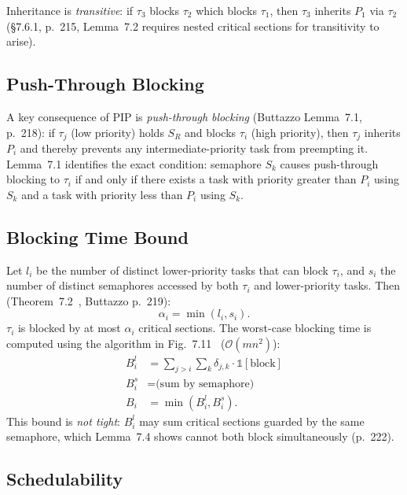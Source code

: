 \documentclass[conference]{IEEEtran}
\begin{document}
Inheritance is \emph{transitive}: if $\tau_3$ blocks $\tau_2$ which
blocks $\tau_1$, then $\tau_3$ inherits $P_1$ via $\tau_2$
(§7.6.1, p.~215, Lemma~7.2 requires nested critical sections for
transitivity to arise).

\subsection{Push-Through Blocking}

A key consequence of PIP is \emph{push-through blocking}
(Buttazzo Lemma~7.1, p.~218): if $\tau_j$ (low priority) holds
$S_R$ and blocks $\tau_i$ (high priority), then $\tau_j$ inherits
$P_i$ and thereby prevents any intermediate-priority task from preempting
it.
Lemma~7.1 identifies the exact condition:
semaphore $S_k$ causes push-through blocking to $\tau_i$ if and only
if there exists a task with priority greater than $P_i$ using $S_k$
and a task with priority less than $P_i$ using $S_k$.

\subsection{Blocking Time Bound}

Let $l_i$ be the number of distinct lower-priority tasks that can block
$\tau_i$, and $s_i$ the number of distinct semaphores accessed by both
$\tau_i$ and lower-priority tasks.
Then (Theorem~7.2~\cite{Sha1990}, Buttazzo p.~219):
\begin{equation}
  \alpha_i = \min(l_i, s_i).
  \label{eq:alpha}
\end{equation}
$\tau_i$ is blocked by at most $\alpha_i$ critical sections.
The worst-case blocking time is computed using the algorithm in
Fig.~7.11~\cite{Buttazzo2011} ($\mathcal{O}(mn^2)$):
\begin{align}
  B_i^l &= \sum_{j>i}\sum_k \delta_{j,k} \cdot \mathbb{1}[\text{block}]
  \label{eq:bl}\\
  B_i^s &= \text{(sum by semaphore)}
  \label{eq:bs}\\
  B_i   &= \min(B_i^l, B_i^s).
  \label{eq:bi}
\end{align}
This bound is \emph{not tight}: $B_i^l$ may sum critical sections
guarded by the same semaphore, which Lemma~7.4 shows cannot both block
simultaneously (p.~222).

\subsection{Schedulability}
\end{document}
